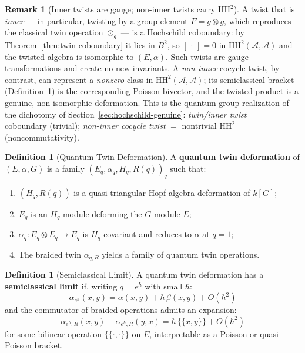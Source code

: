 \documentclass[11pt,a4paper,openany]{book}
\theoremstyle{plain}
\theoremstyle{definition}
\newtheorem{definition}[theorem]{Definition}
\newtheorem{remark}[theorem]{Remark}
\newcommand{\twing}[1]{\odot_{#1}}
\newcommand{\actspace}{E}
\newcommand{\groupG}{G}
\begin{document}
\begin{remark}[Inner twists are gauge; non-inner twists carry $\mathrm{HH}^2$]\label{rem:twist-dichotomy}
A twist that is \emph{inner} --- in particular, twisting by a group element $F = g \otimes g$, which reproduces the classical twin operation $\twing{g}$ --- is a Hochschild coboundary: by Theorem~\ref{thm:twin-coboundary} it lies in $B^2$, so $[\,\cdot\,]=0$ in $\mathrm{HH}^2(\mathcal{A},\mathcal{A})$ and the twisted algebra is isomorphic to $(\actspace,\alpha)$. Such twists are gauge transformations and create no new invariants. A \emph{non-inner} cocycle twist, by contrast, can represent a \emph{nonzero} class in $\mathrm{HH}^2(\mathcal{A},\mathcal{A})$; its semiclassical bracket (Definition~\ref{def:semiclassical}) is the corresponding Poisson bivector, and the twisted product is a genuine, non-isomorphic deformation. This is the quantum-group realization of the dichotomy of Section~\ref{sec:hochschild-genuine}: \emph{twin/inner twist} $=$ coboundary (trivial); \emph{non-inner cocycle twist} $=$ nontrivial $\mathrm{HH}^2$ (noncommutativity).
\end{remark}

\begin{definition}[Quantum Twin Deformation]\label{def:quantum-def}
A \textbf{quantum twin deformation} of $(\actspace, \alpha, \groupG)$ is a family $(\actspace_q, \alpha_q, H_q, R(q))_q$ such that:
\begin{enumerate}
    \item $(H_q, R(q))$ is a quasi-triangular Hopf algebra deformation of $k[\groupG]$;
    \item $\actspace_q$ is an $H_q$-module deforming the $\groupG$-module $\actspace$;
    \item $\alpha_q : \actspace_q \otimes \actspace_q \to \actspace_q$ is $H_q$-covariant and reduces to $\alpha$ at $q = 1$;
    \item The braided twin $\alpha_{q,R}$ yields a family of quantum twin operations.
\end{enumerate}
\end{definition}

\begin{definition}[Semiclassical Limit]\label{def:semiclassical}
A quantum twin deformation has a \textbf{semiclassical limit} if, writing $q = e^\hbar$ with small $\hbar$:
\[
\alpha_{e^\hbar}(x, y) = \alpha(x, y) + \hbar\, \beta(x, y) + O(\hbar^2)
\]
and the commutator of braided operations admits an expansion:
\[
\alpha_{e^\hbar, R}(x, y) - \alpha_{e^\hbar, R}(y, x) = \hbar\, \{\!\{x, y\}\!\} + O(\hbar^2)
\]
for some bilinear operation $\{\!\{{\cdot}, {\cdot}\}\!\}$ on $\actspace$, interpretable as a Poisson or quasi-Poisson bracket.
\end{definition}
\end{document}
